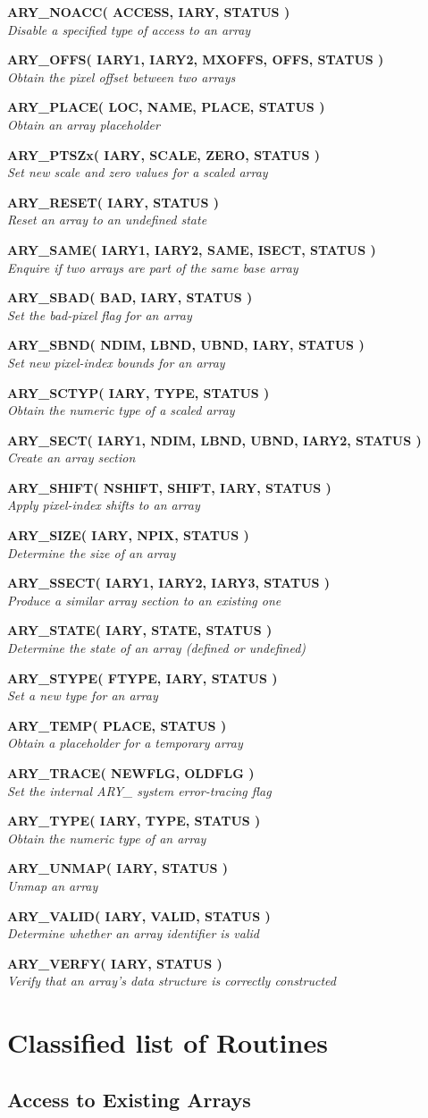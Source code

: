 \documentclass[twoside,11pt]{article}
\newcommand{\xlabel}[1]{}
\newcommand{\noteroutine}[2]{\textbf{#1}\hspace*{\fill}\nopagebreak \\
                             \hspace*{3em}\emph{#2}\hspace*{\fill}\par}
\begin{document}
\noteroutine{ARY\_NOACC( ACCESS, IARY, STATUS )}
            {Disable a specified type of access to an array}
\noteroutine{ARY\_OFFS( IARY1, IARY2, MXOFFS, OFFS, STATUS )}
            {Obtain the pixel offset between two arrays}
\noteroutine{ARY\_PLACE( LOC, NAME, PLACE, STATUS )}
            {Obtain an array placeholder}
\noteroutine{ARY\_PTSZx( IARY, SCALE, ZERO, STATUS )}
            {Set new scale and zero values for a scaled array}
\noteroutine{ARY\_RESET( IARY, STATUS )}
            {Reset an array to an undefined state}
\noteroutine{ARY\_SAME( IARY1, IARY2, SAME, ISECT, STATUS )}
            {Enquire if two arrays are part of the same base array}
\noteroutine{ARY\_SBAD( BAD, IARY, STATUS )}
            {Set the bad-pixel flag for an array}
\noteroutine{ARY\_SBND( NDIM, LBND, UBND, IARY, STATUS )}
            {Set new pixel-index bounds for an array}
\noteroutine{ARY\_SCTYP( IARY, TYPE, STATUS )}
            {Obtain the numeric type of a scaled array}
\noteroutine{ARY\_SECT( IARY1, NDIM, LBND, UBND, IARY2, STATUS )}
            {Create an array section}
\noteroutine{ARY\_SHIFT( NSHIFT, SHIFT, IARY, STATUS )}
            {Apply pixel-index shifts to an array}
\noteroutine{ARY\_SIZE( IARY, NPIX, STATUS )}
            {Determine the size of an array}
\noteroutine{ARY\_SSECT( IARY1, IARY2, IARY3, STATUS )}
            {Produce a similar array section to an existing one}
\noteroutine{ARY\_STATE( IARY, STATE, STATUS )}
            {Determine the state of an array (defined or undefined)}
\noteroutine{ARY\_STYPE( FTYPE, IARY, STATUS )}
            {Set a new type for an array}
\noteroutine{ARY\_TEMP( PLACE, STATUS )}
            {Obtain a placeholder for a temporary array}
\noteroutine{ARY\_TRACE( NEWFLG, OLDFLG )}
            {Set the internal ARY\_ system error-tracing flag}
\noteroutine{ARY\_TYPE( IARY, TYPE, STATUS )}
            {Obtain the numeric type of an array}
\noteroutine{ARY\_UNMAP( IARY, STATUS )}
            {Unmap an array}
\noteroutine{ARY\_VALID( IARY, VALID, STATUS )}
            {Determine whether an array identifier is valid}
\noteroutine{ARY\_VERFY( IARY, STATUS )}
            {Verify that an array's data structure is correctly constructed}


\newpage
\section{\xlabel{classified_list_of_routines}Classified list of Routines}
\label{classified_list_of_routines}


\subsection{\xlabel{access_to_existing_arrays}Access to Existing Arrays}
\label{access_to_existing_arrays}
\end{document}
